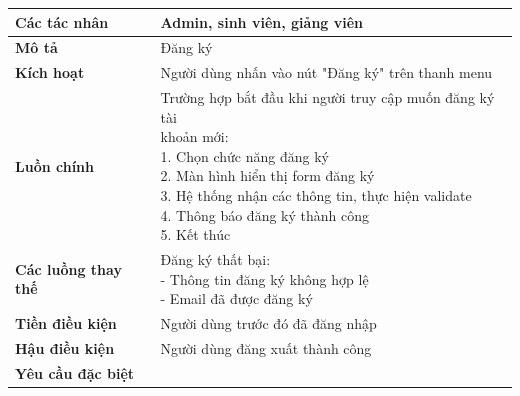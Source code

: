 \begin{tabular}{|l|p{}|}
	\hline
	\textbf{Các tác nhân}       & Admin, sinh viên, giảng viên                                        \\
	\hline
	\textbf{Mô tả}              & Đăng ký                                                             \\
	\hline
	\textbf{Kích hoạt}          & Người dùng nhấn vào nút "Đăng ký" trên thanh menu                   \\
	\hline
	\textbf{Luồn chính}         & \makecell[l]{Trường hợp bắt đầu khi người truy cập muốn đăng ký tài \\khoản mới: \\ 1. Chọn chức năng đăng ký \\ 2. Màn hình hiển thị form đăng ký \\ 3. Hệ thống nhận các thông tin, thực hiện validate \\ 4. Thông báo đăng ký thành công \\ 5. Kết thúc} \\
	\hline
	\textbf{Các luồng thay thế} & \makecell[l]{Đăng ký thất bại:                                      \\ - Thông tin đăng ký không hợp lệ \\ - Email đã được đăng ký} \\
	\hline
	\textbf{Tiền điều kiện}     & Người dùng trước đó đã đăng nhập                                    \\
	\hline
	\textbf{Hậu điều kiện}      & Người dùng đăng xuất thành công                                     \\
	\hline
	\textbf{Yêu cầu đặc biệt}   &                                                                     \\
	\hline
\end{tabular}

